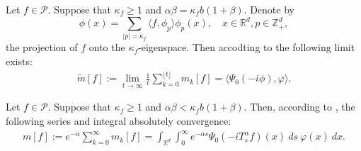 \documentclass[12pt,oneside,english]{amsart}
\theoremstyle{plain}
\theoremstyle{definition}
\numberwithin{equation}{section}
\begin{document}
    Let $f \in \mathcal{P}$.
    Suppose that $\kappa_f\geq 1$ and $\alpha\beta=\kappa_f b(1+\beta)$.
    Denote by
\[
    \phi(x)
    =\sum_{|p|=\kappa_f}\langle f, \phi_p\rangle\phi_p(x),
    \quad x\in \mathbb{R}^d, p \in\mathbb Z_+^d,
\]
    the projection of $f$ onto the $\kappa_f$-eigenspace.
    Then accodting to \cite[Lemma 4.2]{MM} the following limit exists:
\begin{align}
\label{para: critical case}
    \tilde{m}[f]:=\lim_{t\rightarrow \infty}\frac{1}{t}\sum_{k=0}^{\lfloor t \rfloor}m_k[f]=\langle\Psi_0(-i\phi),\varphi\rangle.
\end{align}

    Let $f\in \mathcal{P}$.
    Suppose that $\kappa_f\geq 1$ and $\alpha\beta<\kappa_fb(1+\beta)$. Then, according to \cite[Lemma 5.1]{MM}, the following series and integral absolutely convergence:
\begin{align}
    m[f]
    :=e^{-\alpha}\sum_{k=0}^\infty m_k[f]
    =\int_{\mathbb{R}^d}\int_0^{\infty} e^{-\alpha s}\Psi_0(-iT_{s}^{\alpha}f)(x)~ds~\varphi(x)~dx. \label{msmallcase}
\end{align}
\end{document}
